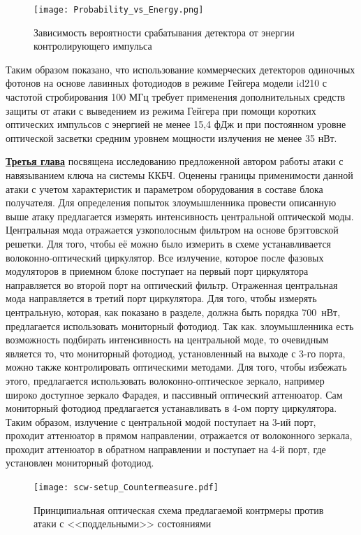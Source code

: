 \begin{figure}[ht]
  \centering
  \texttt{[image: Probability\_vs\_Energy.png]}
  \caption{Зависимость вероятности срабатывания детектора от энергии контролирующего импульса}
  \label{fig:Probability_vs_Energy}
\end{figure}


Таким образом показано, что использование коммерческих детекторов одиночных фотонов на основе лавинных фотодиодов в режиме Гейгера модели id210 с частотой стробирования 100 МГц  требует применения дополнительных средств защиты от атаки с выведением из режима Гейгера при помощи коротких оптических импульсов с энергией не менее 15,4 фДж и при постоянном уровне оптической засветки средним уровнем мощности излучения не менее 35 нВт.  

 \underline{\textbf{Третья глава}} посвящена исследованию предложенной автором работы атаки с навязыванием ключа на системы ККБЧ. Оценены границы применимости данной атаки с учетом характеристик и параметром оборудования в составе блока получателя. Для определения попыток злоумышленника провести описанную выше атаку предлагается измерять интенсивность центральной оптической моды. Центральная мода отражается узкополосным фильтром на основе брэгговской решетки. Для того, чтобы её можно было измерить в схеме устанавливается волоконно-оптический циркулятор. Все излучение, которое после фазовых модуляторов в приемном блоке поступает на первый порт циркулятора направляется во второй порт на оптический фильтр. Отраженная центральная мода направляется в третий порт циркулятора. Для того, чтобы измерять центральную, которая, как показано в разделе, должна быть порядка 700~нВт, предлагается использовать мониторный фотодиод. Так как. злоумышленника есть возможность подбирать интенсивность на центральной моде, то очевидным является то, что мониторный фотодиод, установленный на выходе с 3-го порта, можно также контролировать оптическими методами. Для того, чтобы избежать этого, предлагается использовать волоконно-оптическое зеркало, например широко доступное зеркало Фарадея, и пассивный оптический аттенюатор. Сам мониторный фотодиод предлагается устанавливать в 4-ом порту циркулятора. Таким образом, излучение с центральной модой поступает на 3-ий порт, проходит аттенюатор в прямом направлении, отражается от волоконного зеркала, проходит аттенюатор в обратном направлении и поступает на 4-й порт, где установлен мониторный фотодиод.         
 \begin{figure}[ht]
  \centering
  \texttt{[image: scw-setup\_Countermeasure.pdf]}
  \caption{Принципиальная оптическая схема предлагаемой контрмеры против атаки с <<поддельными>> состояниями}
  \label{fig:countermeasure}
\end{figure}
 
